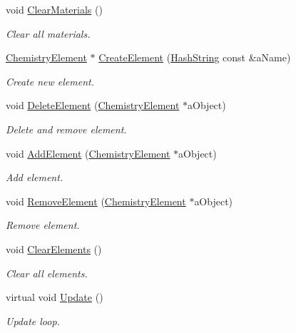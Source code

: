 \begin{DoxyCompactItemize}
void \hyperlink{classChemistryManager_ac7e9659c9f18f0fd40c0f63e8cf16ccd}{Clear\+Materials} ()
\begin{DoxyCompactList}\small\item\em Clear all materials. \end{DoxyCompactList}\item 
\hyperlink{classChemistryElement}{Chemistry\+Element} $\ast$ \hyperlink{classChemistryManager_af13665223b7d72d9416c2956b44982e1}{Create\+Element} (\hyperlink{classHashString}{Hash\+String} const \&a\+Name)
\begin{DoxyCompactList}\small\item\em Create new element. \end{DoxyCompactList}\item 
void \hyperlink{classChemistryManager_ae791e70e925985e79f0727a633772a92}{Delete\+Element} (\hyperlink{classChemistryElement}{Chemistry\+Element} $\ast$a\+Object)
\begin{DoxyCompactList}\small\item\em Delete and remove element. \end{DoxyCompactList}\item 
void \hyperlink{classChemistryManager_a813a5eed385e4cd39bba2f88ec0c5ce9}{Add\+Element} (\hyperlink{classChemistryElement}{Chemistry\+Element} $\ast$a\+Object)
\begin{DoxyCompactList}\small\item\em Add element. \end{DoxyCompactList}\item 
void \hyperlink{classChemistryManager_a0fda6ba4a697ed8bcdda5d0eb222f3f3}{Remove\+Element} (\hyperlink{classChemistryElement}{Chemistry\+Element} $\ast$a\+Object)
\begin{DoxyCompactList}\small\item\em Remove element. \end{DoxyCompactList}\item 
void \hyperlink{classChemistryManager_a7045f82efe53c79fbbcb5658f58fea45}{Clear\+Elements} ()
\begin{DoxyCompactList}\small\item\em Clear all elements. \end{DoxyCompactList}\item 
virtual void \hyperlink{classChemistryManager_aa65a3231440bbab7f588f136c0439fee}{Update} ()
\begin{DoxyCompactList}\small\item\em Update loop. \end{DoxyCompactList}\item 

\end{DoxyCompactItemize}
